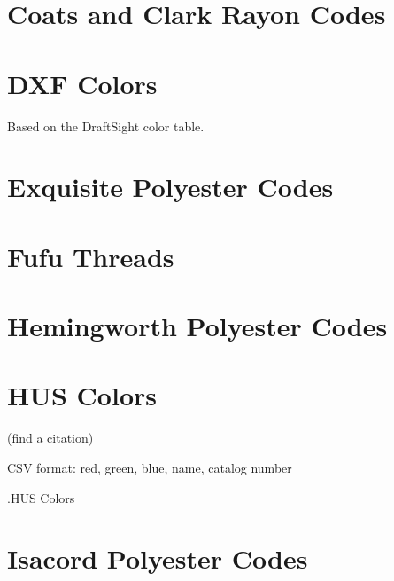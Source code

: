 \documentclass[a4paper]{report}
\begin{document}
%

%

\section{Coats and Clark Rayon Codes}

%

\section{DXF Colors}

Based on the DraftSight color table.

%

\section{Exquisite Polyester Codes}

%

\section{Fufu Threads}

%

%

\section{Hemingworth Polyester Codes}

%

\section{HUS Colors}

(find a citation)

CSV format: red, green, blue, name, catalog number

.HUS Colors

%

\section{Isacord Polyester Codes}
\end{document}

